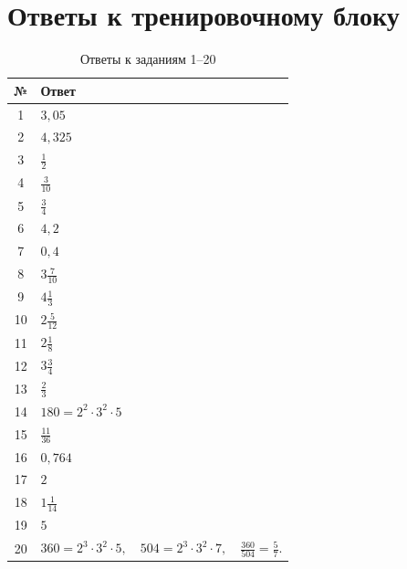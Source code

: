 \documentclass[a4paper,12pt]{article}
\begin{document}
\clearpage

\section*{Ответы к тренировочному блоку}

\begin{table}[ht]
\centering

\caption{Ответы к заданиям 1--20}

\begin{tabularx}
  {\linewidth}
  {@{}cX@{}}

\toprule
№ & Ответ \\
\midrule

1  & \(3{,}05\) \\

2  & \(4{,}325\) \\

3  & \(\frac12\) \\

4  & \(\frac3{10}\) \\

5  & \(\frac34\) \\

6  & \(4{,}2\) \\

7  & \(0{,}4\) \\

8  & \(3\frac7{10}\) \\

9  & \(4\frac13\) \\

10 & \(2\frac5{12}\) \\

11 & \(2\frac18\) \\

12 & \(3\frac34\) \\

13 & \(\frac23\) \\

14 & \(180=2^2\cdot3^2\cdot5\) \\

15 & \(\frac{11}{36}\) \\

16 & \(0{,}764\) \\

17 & \(2\) \\

18 & \(1\frac1{14}\) \\

19 & \(5\) \\

20 &
\(
360=2^3\cdot3^2\cdot5,
\quad
504=2^3\cdot3^2\cdot7,
\quad
\frac{360}{504}=\frac57
\).
\\

\bottomrule
\end{tabularx}

\end{table}
\end{document}
